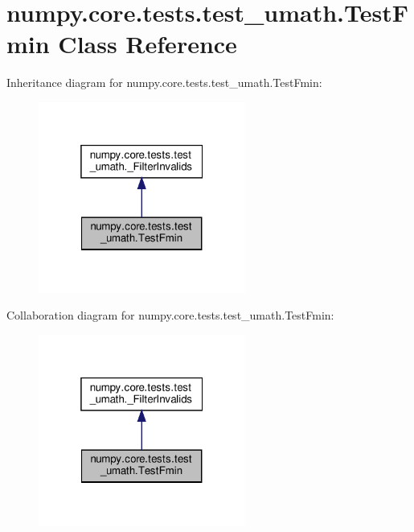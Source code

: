 \hypertarget{classnumpy_1_1core_1_1tests_1_1test__umath_1_1TestFmin}{}\section{numpy.\+core.\+tests.\+test\+\_\+umath.\+Test\+Fmin Class Reference}
\label{classnumpy_1_1core_1_1tests_1_1test__umath_1_1TestFmin}


Inheritance diagram for numpy.\+core.\+tests.\+test\+\_\+umath.\+Test\+Fmin\+:
\nopagebreak
\begin{figure}[H]
\begin{center}
\leavevmode
\includegraphics[width=193pt]{classnumpy_1_1core_1_1tests_1_1test__umath_1_1TestFmin__inherit__graph}
\end{center}
\end{figure}


Collaboration diagram for numpy.\+core.\+tests.\+test\+\_\+umath.\+Test\+Fmin\+:
\nopagebreak
\begin{figure}[H]
\begin{center}
\leavevmode
\includegraphics[width=193pt]{classnumpy_1_1core_1_1tests_1_1test__umath_1_1TestFmin__coll__graph}
\end{center}
\end{figure}
